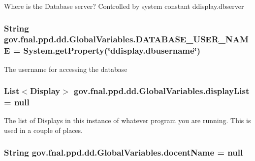 Where is the Database server? Controlled by system constant ddisplay.\-dbserver \hypertarget{classgov_1_1fnal_1_1ppd_1_1dd_1_1GlobalVariables_a1b5c1519d1964bf42b3fe4908ae6d444}{
\subsubsection[{D\-A\-T\-A\-B\-A\-S\-E\-\_\-\-U\-S\-E\-R\-\_\-\-N\-A\-M\-E}]{\setlength{\rightskip}{0pt plus 5cm}String gov.\-fnal.\-ppd.\-dd.\-Global\-Variables.\-D\-A\-T\-A\-B\-A\-S\-E\-\_\-\-U\-S\-E\-R\-\_\-\-N\-A\-M\-E = System.\-get\-Property(\char`\"{}ddisplay.\-dbusername\char`\"{})\hspace{0.3cm}{\ttfamily [static]}}}\label{classgov_1_1fnal_1_1ppd_1_1dd_1_1GlobalVariables_a1b5c1519d1964bf42b3fe4908ae6d444}
The username for accessing the database \hypertarget{classgov_1_1fnal_1_1ppd_1_1dd_1_1GlobalVariables_a30efdc2ab60dd04f76dc1210b8447426}{
\subsubsection[{display\-List}]{\setlength{\rightskip}{0pt plus 5cm}List$<${\bf Display}$>$ gov.\-fnal.\-ppd.\-dd.\-Global\-Variables.\-display\-List = null\hspace{0.3cm}{\ttfamily [static]}}}\label{classgov_1_1fnal_1_1ppd_1_1dd_1_1GlobalVariables_a30efdc2ab60dd04f76dc1210b8447426}
The list of Displays in this instance of whatever program you are running. This is used in a couple of places. \hypertarget{classgov_1_1fnal_1_1ppd_1_1dd_1_1GlobalVariables_a1a8699e7b2ec1e9cad652869fedafa2b}{
\subsubsection[{docent\-Name}]{\setlength{\rightskip}{0pt plus 5cm}String gov.\-fnal.\-ppd.\-dd.\-Global\-Variables.\-docent\-Name = null\hspace{0.3cm}{\ttfamily [static]}}}\label{classgov_1_1fnal_1_1ppd_1_1dd_1_1GlobalVariables_a1a8699e7b2ec1e9cad652869fedafa2b}
